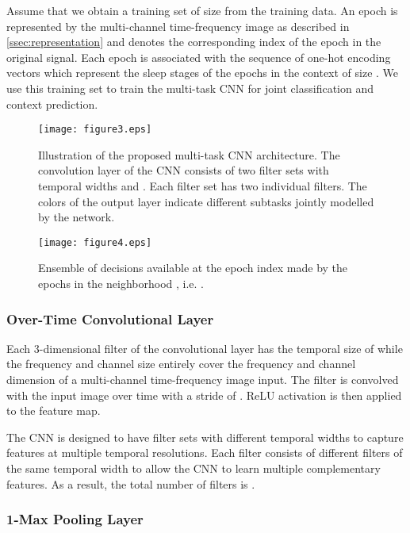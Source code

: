 \documentclass[10pt,twocolumn,twoside]{IEEEtran}
\begin{document}
Assume that we obtain a training set  of size  from the training data. An epoch  is represented by the multi-channel time-frequency image  as described in \ref{ssec:representation} and  denotes the corresponding index of the epoch in the original signal. Each epoch  is associated with the sequence of one-hot encoding vectors  which represent the sleep stages of the epochs in the context  of size . We use this training set to train the multi-task CNN for joint classification and context prediction.

\begin{figure} [!t]
	\centering
	\texttt{[image: figure3.eps]}
	\caption{Illustration of the proposed multi-task CNN architecture. The convolution layer of the CNN consists of two filter sets with temporal widths  and . Each filter set has two individual filters. The colors of the output layer indicate different subtasks jointly modelled by the network.}
	\label{fig:cnn}
\end{figure}

\begin{figure*} [!t]
	\centering
	\texttt{[image: figure4.eps]}
	\caption{Ensemble of decisions available at the epoch index  made by the epochs  in the neighborhood , i.e. .}
	\label{fig:context_smoothing}
\end{figure*}

\subsubsection{Over-Time Convolutional Layer}

Each 3-dimensional filter  of the convolutional layer has the temporal size of  while the frequency and channel size entirely cover the frequency and channel dimension of a multi-channel time-frequency image input. The filter is convolved with the input image over time with a stride of . ReLU activation \cite{Nair2010} is then applied to the feature map. 

The CNN is designed to have  filter sets with different temporal widths  to capture features at multiple temporal resolutions. Each filter consists of  different filters of the same temporal width to allow the CNN to learn multiple complementary features. As a result, the total number of filters is .

\subsubsection{1-Max Pooling Layer}
\end{document}
